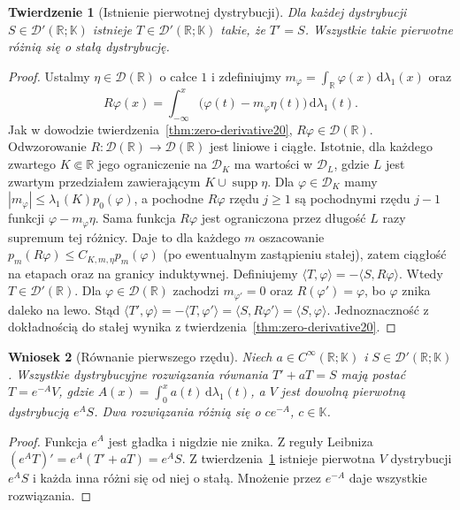 \documentclass[11pt,a4paper]{article}
\numberwithin{equation}{section}
\theoremstyle{plain}
\newtheorem{twierdzenie}{Twierdzenie}[section]
\newtheorem{wniosek}[twierdzenie]{Wniosek}
\theoremstyle{definition}
\theoremstyle{remark}
\newcommand{\R}{\mathbb R}
\newcommand{\K}{\mathbb K}
\DeclareMathOperator{\supp}{supp}
\begin{document}
\begin{twierdzenie}[Istnienie pierwotnej dystrybucji]
\label{thm:primitive20}
Dla każdej dystrybucji $S\in\mathcal D'(\R;\K)$
istnieje $T\in\mathcal D'(\R;\K)$ takie, że $T'=S$.
Wszystkie takie pierwotne różnią się o stałą dystrybucję.
\end{twierdzenie}
\begin{proof}
Ustalmy $\eta\in\mathcal D(\R)$ o całce $1$ i
zdefiniujmy $m_\varphi=\int_\R\varphi(x)\,\mathrm d\lambda_1(x)$
oraz
\[
 R\varphi(x)=\int_{-\infty}^x
 \bigl(\varphi(t)-m_\varphi\eta(t)\bigr)\,\mathrm d\lambda_1(t).
\]
Jak w dowodzie twierdzenia~\ref{thm:zero-derivative20},
$R\varphi\in\mathcal D(\R)$. Odwzorowanie
$R:\mathcal D(\R)\to\mathcal D(\R)$ jest liniowe i ciągłe.
Istotnie, dla każdego zwartego $K\Subset\R$ jego ograniczenie
na $\mathcal D_K$ ma wartości w
$\mathcal D_L$, gdzie $L$ jest zwartym przedziałem
zawierającym $K\cup\supp\eta$.
Dla $\varphi\in\mathcal D_K$ mamy
$|m_\varphi|\le\lambda_1(K)p_0(\varphi)$, a pochodne
$R\varphi$ rzędu $j\ge1$ są pochodnymi rzędu $j-1$
funkcji $\varphi-m_\varphi\eta$.
Sama funkcja $R\varphi$ jest ograniczona przez długość $L$
razy supremum tej różnicy. Daje to dla każdego $m$ oszacowanie
$p_m(R\varphi)\le C_{K,m,\eta}p_m(\varphi)$
(po ewentualnym zastąpieniu stałej), zatem ciągłość na etapach
oraz na granicy induktywnej.
Definiujemy
$\langle T,\varphi\rangle=-\langle S,R\varphi\rangle$.
Wtedy $T\in\mathcal D'(\R)$.
Dla $\varphi\in\mathcal D(\R)$ zachodzi $m_{\varphi'}=0$
oraz $R(\varphi')=\varphi$, bo $\varphi$ znika daleko na lewo.
Stąd
$\langle T',\varphi\rangle=-\langle T,\varphi'\rangle
=\langle S,R\varphi'\rangle=\langle S,\varphi\rangle$.
Jednoznaczność z dokładnością do stałej wynika z
twierdzenia~\ref{thm:zero-derivative20}.
\end{proof}

\begin{wniosek}[Równanie pierwszego rzędu]
\label{cor:ode20}
Niech $a\in C^\infty(\R;\K)$ i
$S\in\mathcal D'(\R;\K)$. Wszystkie dystrybucyjne
rozwiązania równania $T'+aT=S$ mają postać
$T=e^{-A}V$, gdzie $A(x)=\int_0^xa(t)\,\mathrm d\lambda_1(t)$,
a $V$ jest dowolną pierwotną dystrybucją $e^AS$.
Dwa rozwiązania różnią się o $c e^{-A}$, $c\in\K$.
\end{wniosek}
\begin{proof}
Funkcja $e^A$ jest gładka i nigdzie nie znika.
Z reguły Leibniza $(e^AT)'=e^A(T'+aT)=e^AS$.
Z twierdzenia~\ref{thm:primitive20} istnieje pierwotna
$V$ dystrybucji $e^AS$ i każda inna różni się od niej
o stałą. Mnożenie przez $e^{-A}$ daje wszystkie rozwiązania.
\end{proof}
\end{document}
